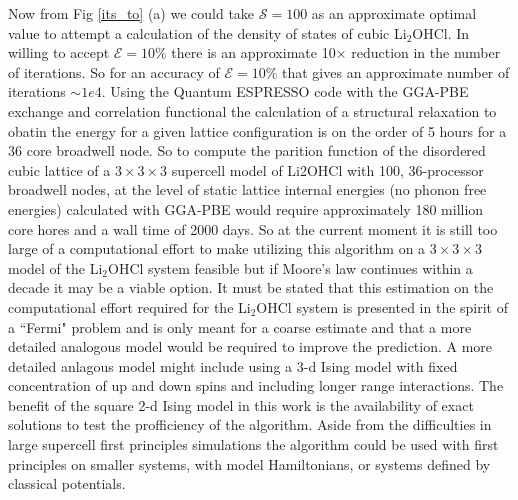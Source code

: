 \documentclass[aps,prl,reprint,superscriptaddress,showkeys]{revtex4-1}
\begin{document}
 Now from Fig \ref{its_to} (a) we could take $\mathcal{S}=100$  as an approximate optimal value to attempt a calculation of the density of states of cubic Li$_2$OHCl. In willing to accept $\mathcal{E}=10\%$ there is an approximate 10$\times$ reduction in the number of iterations. So for an accuracy of $\mathcal{E}=10\%$ that gives an approximate number of iterations  $\sim 1e4$. Using the Quantum ESPRESSO code with the GGA-PBE exchange and correlation functional the calculation of a structural relaxation to obatin the energy for a given lattice configuration is on the order of 5 hours for a 36 core broadwell node. So to compute the parition function of the disordered cubic lattice of a $3\times 3 \times 3$ supercell model of Li2OHCl with 100,  36-processor broadwell nodes, at the level of static lattice internal energies (no phonon free energies) calculated with GGA-PBE   would require approximately 180 million core hores and a wall time of 2000 days.   So at the current moment it is still  too large of a computational effort to make utilizing this algorithm on a $3\times  3 \times 3$ model of the Li$_2$OHCl system feasible but if Moore's law continues within a decade it may be a viable option. It must be stated that this estimation on the computational effort required for the Li$_2$OHCl system is presented in the spirit of a ``Fermi" problem and is only meant for a coarse estimate and that a more detailed analogous model would be required to improve the prediction. A more detailed anlagous model might include using a 3-d Ising model with fixed concentration of up and down spins and including longer range interactions. The benefit of the square 2-d Ising model in this work is the availability of exact solutions to test the profficiency of the algorithm. Aside from the difficulties in large supercell first principles simulations the algorithm could be used with first principles on smaller systems, with model Hamiltonians, or systems defined by classical potentials.  
\end{document}
